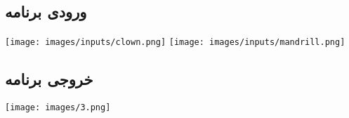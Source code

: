 \documentclass[12pt]{article}
\begin{document}
	
		\subsection{ورودی برنامه}
		
		\texttt{[image: images/inputs/clown.png]}
		\texttt{[image: images/inputs/mandrill.png]}
		
		\subsection{خروجی برنامه}
		
		\texttt{[image: images/3.png]}
		\newpage
		
\end{document}
